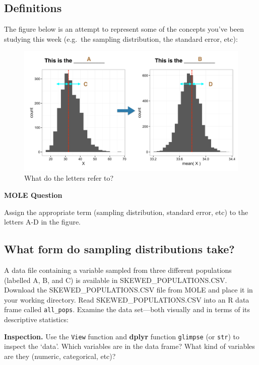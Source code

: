 \documentclass[]{book}
\begin{document}
\subsection{Definitions}\label{definitions}

The figure below is an attempt to represent some of the concepts you've
been studying this week (e.g.~the sampling distribution, the standard
error, etc):

\begin{figure}

{\centering \includegraphics[width=0.8\linewidth]{./images/distro} 

}

\caption{What do the letters refer to?}\label{fig:unnamed-chunk-65}
\end{figure}

\begin{do-something}
\textbf{MOLE Question}

Assign the appropriate term (sampling distribution, standard error, etc)
to the letters A-D in the figure.
\end{do-something}

\subsection{What form do sampling distributions
take?}\label{what-form-do-sampling-distributions-take}

A data file containing a variable sampled from three different
populations (labelled A, B, and C) is available in
SKEWED\_POPULATIONS.CSV. Download the SKEWED\_POPULATIONS.CSV file from
MOLE and place it in your working directory. Read
SKEWED\_POPULATIONS.CSV into an R data frame called \texttt{all\_pops}.
Examine the data set---both visually and in terms of its descriptive
statistics:

\textbf{Inspection.} Use the \texttt{View} function and \textbf{dplyr}
function \texttt{glimpse} (or \texttt{str}) to inspect the `data'. Which
variables are in the data frame? What kind of variables are they
(numeric, categorical, etc)?
\end{document}
